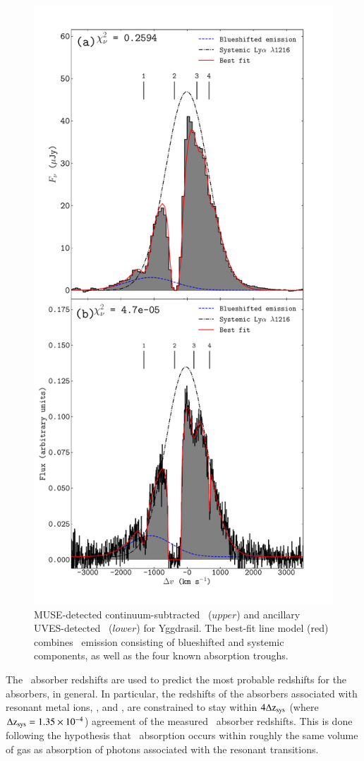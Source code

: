 \begin{figure} 
\centering
\includegraphics[width=0.6\columnwidth]{plots_chp3/Lya_fit_uves_muse_blue_fit.pdf}
\caption[\lya~$\lam1216$ line in MUSE and its best-fit]{MUSE-detected continuum-subtracted \lya~($upper$) and ancillary UVES-detected \lya~($lower$) for Yggdrasil. The best-fit line model (red) combines \lya~emission consisting of blueshifted and systemic components, as well as the four known absorption troughs.}
\label{fig:Lya-line-muse-uves}
\end{figure}

The \lya~absorber redshifts are used to predict the most probable redshifts for the absorbers, in general. In particular, the redshifts of the absorbers associated with resonant metal ions, ,  and , are constrained to stay within $4\Delta{\rm z_{sys}}$  (where $\Delta{\rm z_{sys}} =1.35\times 10^{-4}$) agreement of the measured \lya~absorber redshifts. This is done following the hypothesis that \lya~absorption occurs within roughly the same volume of gas as absorption of photons associated with the resonant transitions. 

